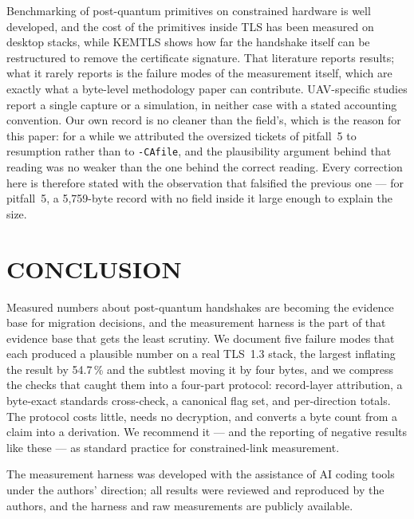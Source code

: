 \documentclass[]{spie}  %
\begin{document}
Benchmarking of post-quantum primitives on constrained hardware is well
developed\cite{pqm4,botros2019}, and the cost of the primitives inside
TLS has been measured on desktop
stacks\cite{paquin2020,sikeridis2020ndss,sikeridis2020conext}, while
KEMTLS shows how far the handshake itself can be restructured to remove
the certificate signature\cite{schwabe2020kemtls}.
That literature reports results; what it rarely reports is the failure
modes of the measurement itself, which are exactly what a byte-level
methodology paper can contribute. UAV-specific studies report a single
capture\cite{xia2024ligkyx} or a simulation\cite{hussien2026pqmavlink},
in neither case with a stated accounting convention. Our own record is
no cleaner than the field's, which is the reason for this paper: for a
while we attributed the oversized tickets of pitfall~5 to resumption
rather than to \texttt{-CAfile}, and the plausibility argument behind
that reading was no weaker than the one behind the correct reading.
Every correction here is therefore stated with the observation that
falsified the previous one --- for pitfall~5, a 5{,}759-byte record with
no field inside it large enough to explain the size.

\section{CONCLUSION}
\label{sec:conclusion}

Measured numbers about post-quantum handshakes are becoming the evidence
base for migration decisions, and the measurement harness is the part of
that evidence base that gets the least scrutiny. We document five
failure modes that each produced a plausible number on a real TLS~1.3
stack, the largest inflating the result by 54.7\,\% and the subtlest
moving it by four bytes, and we compress the checks that caught them
into a four-part protocol: record-layer attribution, a byte-exact
standards cross-check, a canonical flag set, and per-direction totals.
The protocol costs little, needs no decryption, and converts a byte
count from a claim into a derivation. We recommend it --- and the
reporting of negative results like these --- as standard practice for
constrained-link measurement.

\acknowledgments
The measurement harness was developed with the assistance of AI coding
tools under the authors' direction; all results were reviewed and
reproduced by the authors, and the harness and raw measurements are
publicly available.



\end{document}
